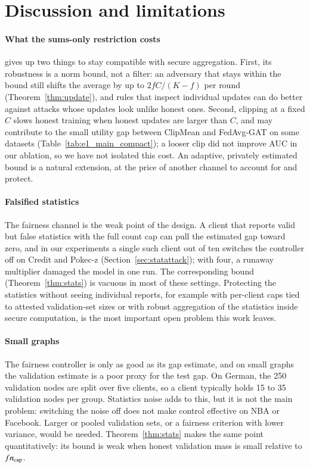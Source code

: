 \section{Discussion and limitations}\label{sec:discussion}

\paragraph{What the sums-only restriction costs}
\clamp{} gives up two things to stay compatible with secure aggregation. First, its robustness is a norm bound, not a filter: an adversary that stays within the bound still shifts the average by up to $2fC/(K-f)$ per round (Theorem~\ref{thm:update}), and rules that inspect individual updates can do better against attacks whose updates look unlike honest ones. Second, clipping at a fixed $C$ slows honest training when honest updates are larger than $C$, and may contribute to the small utility gap between ClipMean and FedAvg-GAT on some datasets (Table~\ref{tab:e1_main_compact}); a looser clip did not improve AUC in our ablation, so we have not isolated this cost. An adaptive, privately estimated bound is a natural extension, at the price of another channel to account for and protect.

\paragraph{Falsified statistics}
The fairness channel is the weak point of the design. A client that reports valid but false statistics with the full count cap can pull the estimated gap toward zero, and in our experiments a single such client out of ten switches the controller off on Credit and Pokec-z (Section~\ref{sec:statattack}); with four, a runaway multiplier damaged the model in one run. The corresponding bound (Theorem~\ref{thm:stats}) is vacuous in most of these settings. Protecting the statistics without seeing individual reports, for example with per-client caps tied to attested validation-set sizes or with robust aggregation of the statistics inside secure computation, is the most important open problem this work leaves.

\paragraph{Small graphs}
The fairness controller is only as good as its gap estimate, and on small graphs the validation estimate is a poor proxy for the test gap. On German, the 250 validation nodes are split over five clients, so a client typically holds 15 to 35 validation nodes per group. Statistics noise adds to this, but it is not the main problem: switching the noise off does not make control effective on NBA or Facebook. Larger or pooled validation sets, or a fairness criterion with lower variance, would be needed. Theorem~\ref{thm:stats} makes the same point quantitatively: its bound is weak when honest validation mass is small relative to $fn_{\mathrm{cap}}$.

